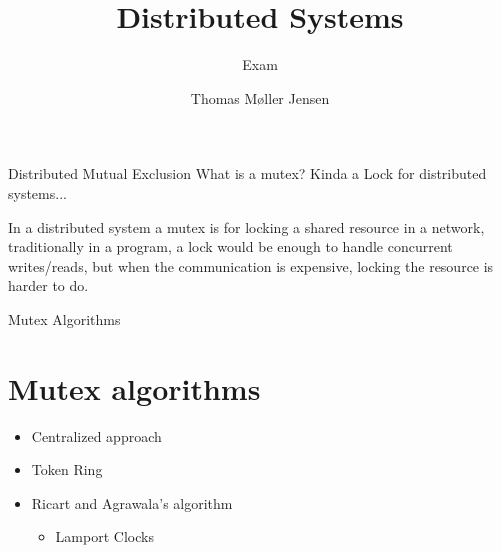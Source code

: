\documentclass[aspectratio=1610,17pt,utf8]{beamer}
\title[DS]{Distributed Systems}
\subtitle{Exam}
\author[Thomas Møller Jensen]{Thomas Møller Jensen}
\institute[Institute of Computer Science]
{
  Aalborg University\\
}
\begin{document}

\begin{frame}{Distributed Mutual Exclusion}
    What is a mutex? Kinda a Lock for distributed systems...

    In a distributed system a mutex is for locking a shared resource in a network, traditionally in a program, a lock would be enough to handle concurrent writes/reads, but when the communication is expensive, locking the resource is harder to do.
\end{frame}

\begin{frame}{Mutex Algorithms}
    \section{Mutex algorithms}
    \begin{itemize}
        \item Centralized approach
        \item Token Ring
        \item Ricart and Agrawala's algorithm
            \begin{itemize} 
                \item Lamport Clocks
            \end{itemize}
    \end{itemize}
\end{frame}
\end{document}
